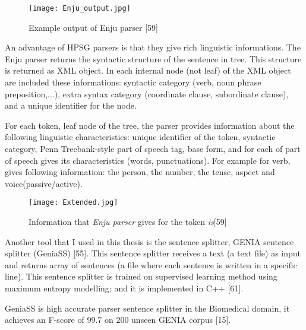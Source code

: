 \begin{figure}[h]
  \begin{center}
	\texttt{[image: Enju\_output.jpg]} 
 	\caption[Example output of Enju parser]{Example output of Enju parser [59] }
	\label{Figure 6}
  \end{center}
\end{figure}

An advantage of HPSG parsers is that they give rich linguistic informations. The Enju parser returns the syntactic structure of the sentence in tree. This structure is returned as XML object. In each internal node (not leaf) of the XML object are included these informations: syntactic category (verb, noun phrase preposition,...), extra syntax category (coordinate clause, subordinate clause), and a unique identifier for the node. 

For each token, leaf node of the tree, the parser provides information about the following linguistic characteristics: unique identifier of the token, syntactic category, Penn Treebank-style part of speech tag, base form, and for each of part of speech gives its characteristics (words, punctuations). For example for verb, gives following information: the person, the number, the tense, aspect and voice(passive/active). 
\begin{figure}[h]
   \begin{center}
		\texttt{[image: Extended.jpg]} 
 		\caption[Information that \emph{Enju parser} gives for the token \emph{is}]{Information that \emph{Enju parser} gives for the token \emph{is}[59]}
		\label{Figure 7}
	\end{center}
\end{figure}
 
Another tool that I used in this thesis is the sentence splitter, GENIA sentence splitter (GeniaSS) [55]. This sentence splitter receives a text (a text file) as input and returns array of sentences (a file where each sentence is written in a specific line). This sentence splitter is trained on supervised learning method using maximum entropy modelling; and it is implemented in C++ [61]. 

GeniaSS is high accurate parser sentence splitter in the Biomedical domain, it achieves an F-score of 99.7 on 200 unseen GENIA corpus [15].
